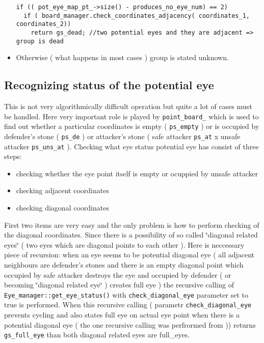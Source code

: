 \begin{itemize}
\footnotesize\begin{verbatim}if (( pot_eye_map_pt_->size() - produces_no_eye_num) == 2)
  if ( board_manager.check_coordinates_adjacency( coordinates_1, coordinates_2)) 
    return gs_dead; //two potential eyes and they are adjacent => group is dead
\end{verbatim}
\normalsize
\item Otherwise ( what happens in most cases ) group is stated unknown.\end{itemize}
\subsection{Recognizing status of the potential eye}\label{page_4_page_4__sec_2}
This is not very algorithmically difficult operation but quite a lot of cases must be handled. Here very important role is played by {\tt point\_\-board\_\-} which is used to find out whether a particular coordinates is empty ( {\tt ps\_\-empty} ) or is occupied by defender's stone ( {\tt ps\_\-de} ) or attacker's stone ( safe attacker {\tt ps\_\-at} x unsafe attacker {\tt ps\_\-uns\_\-at} ). Checking what eye status potential eye has consist of three steps:\begin{itemize}
\item checking whether the eye point itself is empty or ocuppied by unsafe attacker\item checking adjacent coordinates\item checking diagonal coordinates\end{itemize}


First two items are very easy and the only problem is how to perform checking of the diagonal coordinates. Since there is a possibility of so called \char`\"{}diagonal related eyes\char`\"{} ( two eyes which are diagonal points to each other ). Here is neccessary piece of recursion: when an eye seems to be potential diagonal eye ( all adjacent neighbours are defender's stones and there is an empty diagonal point which occupied by safe attacker destroys the eye and occupied by defender ( or becoming \char`\"{}diagonal related eye\char`\"{} ) creates full eye ) the recursive calling of {\tt Eye\_\-manager::get\_\-eye\_\-status()} with {\tt check\_\-diagonal\_\-eye} parameter set to true is performed. When this recursive calling ( parametr {\tt check\_\-diagonal\_\-eye} prevents cycling and also states full eye on actual eye point when there is a potential diagonal eye ( the one recursive calling was perfrormed from )) returns {\tt gs\_\-full\_\-eye} than both diagonal related eyes are full\_\-eyes. 